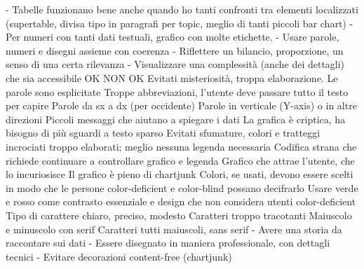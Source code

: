         -	Tabelle funzionano bene anche quando ho tanti confronti tra elementi localizzati (supertable, divisa tipo in paragrafi per topic, meglio di tanti piccoli bar chart)
        -	Per numeri con tanti dati testuali, grafico con molte etichette.
-	Usare parole, numeri e disegni assieme con coerenza
-	Riflettere un bilancio, proporzione, un senso di una certa rilevanza
-	Visualizzare una complessità (anche dei dettagli) che sia accessibile
OK	NON OK
Evitati misteriosità, troppa elaborazione. Le parole sono esplicitate	Troppe abbreviazioni, l'utente deve passare tutto il testo per capire
Parole da sx a dx (per occidente)	Parole in verticale (Y-axis) o in altre direzioni
Piccoli messaggi che aiutano a spiegare i dati	La grafica è criptica, ha bisogno di più sguardi a testo sparso
Evitati sfumature, colori e tratteggi incrociati troppo elaborati; meglio nessuna legenda necessaria	Codifica strana che richiede continuare a controllare grafico e legenda
Grafico che attrae l'utente, che lo incuriosisce	Il grafico è pieno di chartjunk
Colori, se usati, devono essere scelti in modo che le persone color-deficient e color-blind possano decifrarlo	Usare verde e rosso come contrasto essenziale e design che non considera utenti color-deficient 
Tipo di carattere chiaro, preciso, modesto	Caratteri troppo tracotanti
Maiuscolo e minuscolo con serif	Caratteri tutti maiuscoli, sans serif
-	Avere una storia da raccontare sui dati
-	Essere disegnato in maniera professionale, con dettagli tecnici
-	Evitare decorazioni content-free (chartjunk)


